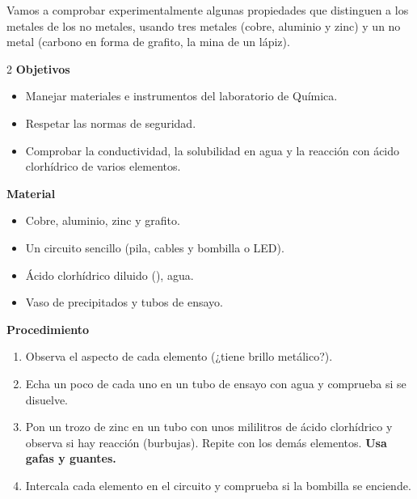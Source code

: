 Vamos a comprobar experimentalmente algunas propiedades que distinguen a los metales de los no metales, usando tres metales (cobre, aluminio y zinc) y un no metal (carbono en forma de grafito, la mina de un lápiz).

\begin{multicols}{2}
    \textbf{Objetivos}
    \begin{itemize}
        \item Manejar materiales e instrumentos del laboratorio de Química.
        \item Respetar las normas de seguridad.
        \item Comprobar la conductividad, la solubilidad en agua y la reacción con ácido clorhídrico de varios elementos.
    \end{itemize}
    \columnbreak
    \textbf{Material}
    \begin{itemize}
        \item Cobre, aluminio, zinc y grafito.
        \item Un circuito sencillo (pila, cables y bombilla o LED).
        \item Ácido clorhídrico diluido (), agua.
        \item Vaso de precipitados y tubos de ensayo.
    \end{itemize}
\end{multicols}

\textbf{Procedimiento}
\begin{enumerate}[label=\numberballgreen]
    \item Observa el aspecto de cada elemento (¿tiene brillo metálico?).
    \item Echa un poco de cada uno en un tubo de ensayo con agua y comprueba si se disuelve.
    \item Pon un trozo de zinc en un tubo con unos mililitros de ácido clorhídrico y observa si hay reacción (burbujas). Repite con los demás elementos. \textbf{Usa gafas y guantes.}
    \item Intercala cada elemento en el circuito y comprueba si la bombilla se enciende.
\end{enumerate}

